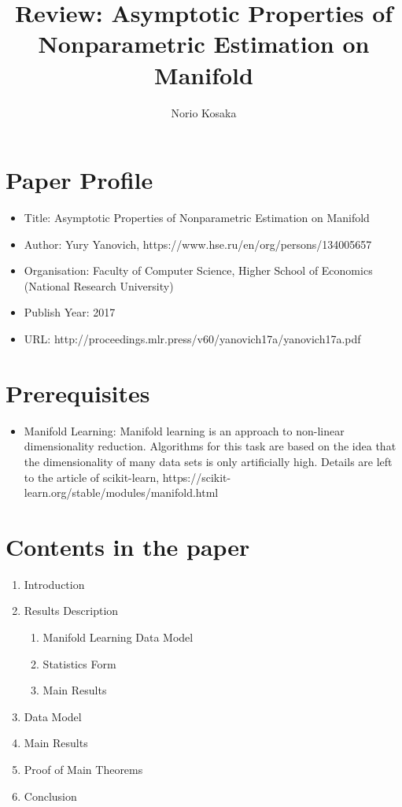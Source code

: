 \documentclass[10pt,a4paper]{article}
\author{Norio Kosaka}
\title{Review: Asymptotic Properties of Nonparametric Estimation on Manifold}
\begin{document}
\maketitle

\section{Paper Profile}
\begin{itemize}
\item Title: Asymptotic Properties of Nonparametric Estimation on Manifold
\item Author: Yury Yanovich, https://www.hse.ru/en/org/persons/134005657
\item Organisation: Faculty of Computer Science, Higher School of Economics (National Research University)
\item Publish Year: 2017
\item URL: http://proceedings.mlr.press/v60/yanovich17a/yanovich17a.pdf
\end{itemize}

\section{Prerequisites}
\begin{itemize}
    \item Manifold Learning: Manifold learning is an approach to non-linear dimensionality reduction. Algorithms for this task are based on the idea that the dimensionality of many data sets is only artificially high. Details are left to the article of scikit-learn, https://scikit-learn.org/stable/modules/manifold.html
\end{itemize}

\section{Contents in the paper}
\begin{enumerate}
\item Introduction
\item Results Description
    \begin{enumerate}
        \item Manifold Learning Data Model
        \item Statistics Form
        \item Main Results
    \end{enumerate}
\item Data Model
\item Main Results
\item Proof of Main Theorems
\item Conclusion
\end{enumerate}
\end{document}
